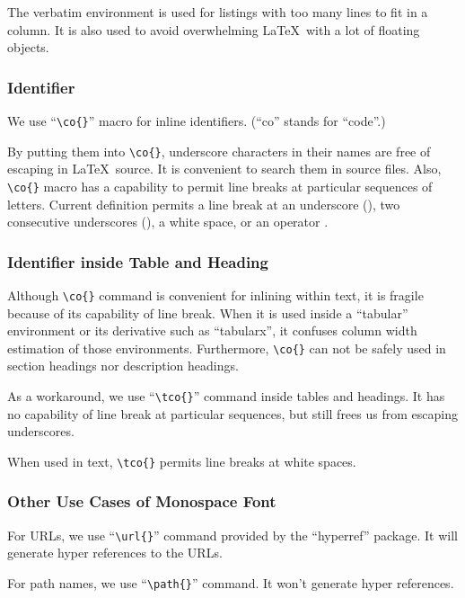 The verbatim environment is used for listings with too many lines
to fit in a column. It is also used to avoid overwhelming
\LaTeX\ with a lot of floating objects.

\subsubsection{Identifier}
\label{sec:app:styleguide:Identifier}

We use ``\verb|\co{}|'' macro for inline identifiers.
(``co'' stands for ``code''.)

By putting them into \verb|\co{}|, underscore characters in
their names are free of escaping in \LaTeX\ source. It is convenient
to search them in source files. Also, \verb|\co{}|
macro has a capability to permit line breaks at particular
sequences of letters. Current definition permits a line break at
an underscore (\tco{_}), two consecutive underscores (\tco{__}),
a white space, or an operator \tco{->}.

\subsubsection{Identifier inside Table and Heading}
\label{sec:app:styleguide:Identifier inside Table and Heading}

Although \verb|\co{}| command is convenient for inlining within text,
it is fragile because of its capability of line break.
When it is used inside a ``tabular'' environment or its derivative
such as ``tabularx'', it confuses column width
estimation of those environments.
Furthermore, \verb|\co{}| can not be safely used in section headings nor
description headings.

As a workaround, we use ``\verb|\tco{}|'' command
inside tables and headings. It has no capability of line break
at particular sequences, but still frees us from escaping
underscores.

When used in text, \verb|\tco{}| permits line breaks at
white spaces.

\subsubsection{Other Use Cases of Monospace Font}
\label{sec:app:styleguide:Other Use Cases of Monospace Font}

For URLs, we use ``\verb|\url{}|'' command provided by the
``hyperref'' package. It will generate hyper references to the
URLs.

For path names, we use ``\verb|\path{}|'' command. It won't
generate hyper references.

